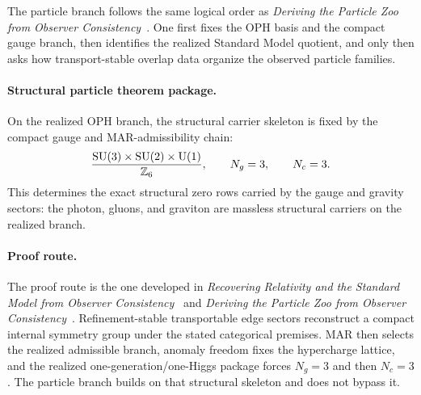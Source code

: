 The particle branch follows the same logical order as
\emph{Deriving the Particle Zoo from Observer Consistency}~\cite{ophparticles}.
One first fixes the OPH basis and the compact gauge branch, then identifies the realized Standard
Model quotient, and only then asks how transport-stable overlap data organize the observed
particle families.

\paragraph{Structural particle theorem package.}
On the realized OPH branch, the structural carrier skeleton is fixed by the compact gauge and
MAR-admissibility chain:
\[
\frac{\mathrm{SU}(3)\times\mathrm{SU}(2)\times\mathrm{U}(1)}{\mathbb Z_6},
\qquad
N_g=3,
\qquad
N_c=3.
\]
This determines the exact structural zero rows carried by the gauge and gravity sectors:
the photon, gluons, and graviton are massless structural carriers on the realized branch.

\paragraph{Proof route.}
The proof route is the one developed in
\emph{Recovering Relativity and the Standard Model from Observer Consistency}~\cite{ophcompact}
and
\emph{Deriving the Particle Zoo from Observer Consistency}~\cite{ophparticles}.
Refinement-stable transportable edge sectors reconstruct a compact internal symmetry group under
the stated categorical premises. MAR then selects the realized admissible branch, anomaly freedom
fixes the hypercharge lattice, and the realized one-generation/one-Higgs package forces \(N_g=3\)
and then \(N_c=3\). The particle branch builds on that structural skeleton and does not bypass
it.

